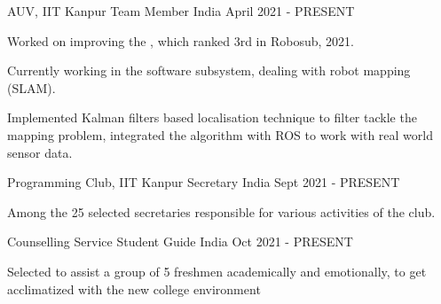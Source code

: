 

\begin{cventries}
  \cventry
    {AUV, IIT Kanpur} %
    {Team Member} %
    {India} %
    {April 2021 - PRESENT} %
    {
      \begin{cvitems} %
        \item {Worked on improving the \href{https://auv.sntiitk.in/}{\color{teal}{team website}}, which ranked 3rd in Robosub, 2021.}
        \item {Currently working in the software subsystem, dealing with robot mapping (SLAM).}
        \item Implemented Kalman filters based localisation technique to filter tackle the mapping problem, integrated the algorithm with ROS to work with real world sensor data.
      \end{cvitems}
    }
    
 \vspace{0.2cm}
 
  \cventry
    {Programming Club, IIT Kanpur} %
    {Secretary} %
    {India} %
    {Sept 2021 - PRESENT} %
    {
      \begin{cvitems} %
        \item {Among the 25 selected secretaries responsible for various activities of the club.}
      \end{cvitems}
    }
    
 \vspace{0.2cm}
 
  \cventry
    {Counselling Service} %
    {Student Guide} %
    {India} %
    {Oct 2021 - PRESENT} %
    {
      \begin{cvitems} %
        \item {Selected to assist a group of 5 freshmen academically and emotionally, to get acclimatized with the new college environment}
      \end{cvitems}
    }
    
\end{cventries}
